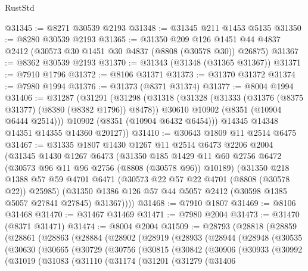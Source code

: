 \begin{lexlean}{RustStd}
\begin{coremodule}
@31345 := @8271 @30539 @2193
@31348 := @31345 @211 @1453 @5135
@31350 := @8280 @30539 @2193
@31365 := @31350
    @209
    @126
    @1451
    @44
    @4837
    @2412
    (@30573 @30 @1451 @30 @4837 (@8808 (@30578 @30)) @26875)
@31367 := @8362 @30539 @2193
@31370 := @31343 (@31348 (@31365 @31367))
@31371 := @7910 @1796
@31372 := @8106 @31371
@31373 := @31370 @31372
@31374 := @7980 @1994
@31376 := @31373 (@8371 @31374)
@31377 := @8004 @1994
@31406 := @31287
    (@31291
      (@31298
        (@31318
          (@31328
            (@31333 (@31376 (@8375 @31377) (@8380 (@8382 @1796)) @8478))
            @30610
            @10902
            (@8351 (@10904 @6444 @2514)))
          @10902
          (@8351 (@10904 @6432 @6454)))
        @14345
        @14348
        @14351
        @14355
        @14360
        @20127))
@31410 := @30643 @1809 @11 @2514 @6475
@31467 := @31335
    @1807
    @1430
    @1267
    @11
    @2514
    @6473
    @2206
    @2004
    (@31345
      @1430
      @1267
      @6473
      (@31350
        @185
        @1429
        @11
        @60
        @2756
        @6472
        (@30573 @96 @11 @96 @2756 (@8808 (@30578 @96)) @10189)
        (@31350
          @218
          @1388
          @57
          @59
          @4701
          @6471
          (@30573 @22 @57 @22 @4701 (@8808 (@30578 @22)) @25985)
          (@31350 @1386 @126 @57 @44 @5057 @2412 (@30598 @1385 @5057 @27841 @27845) @31367))))
@31468 := @7910 @1807
@31469 := @8106 @31468
@31470 := @31467 @31469
@31471 := @7980 @2004
@31473 := @31470 (@8371 @31471)
@31474 := @8004 @2004
@31509 := @28793
    (@28818
      (@28859
        (@28861
          (@28863
            (@28884
              (@28902
                (@28919
                  (@28933
                    (@28944
                      (@28948
                        (@30535
                          (@30630
                            (@30665
                              (@30729
                                (@30756
                                  (@30815
                                    (@30842
                                      (@30906
                                        (@30933
                                          (@30992
                                            (@31019
                                              (@31083
                                                (@31110
                                                  (@31174
                                                    (@31201
                                                      (@31279
                                                        (@31406

\end{coremodule}
\end{lexlean}
